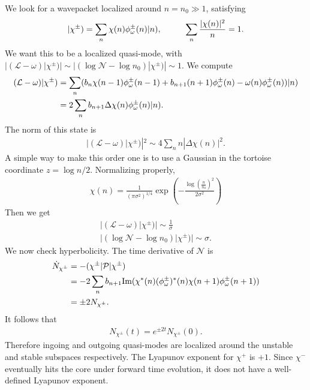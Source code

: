 \documentclass[JHEP,12pt]{article}
\begin{document}
We look for a wavepacket localized around $n=n_0\gg1$, satisfying
\begin{align}
|\chi^{\pm})=\sum_n \chi(n)\phi^{\pm}_\omega(n)|n),\hspace{10 mm}\sum_n \frac{|\chi(n)|^2}{n}=1.
\end{align}
We want this to be a localized quasi-mode, with $|(\mathcal{L}-\omega)|\chi^{\pm})|\sim |(\log\mathcal{N}-\log n_0)|\chi^{\pm})|\sim 1$. We compute 
\begin{align}
(\mathcal{L}-\omega)|\chi^{\pm})&=\sum_n (b_n\chi(n-1)\phi^{\pm}_\omega(n-1)+b_{n+1}(n+1)\phi^{\pm}_\omega(n)-\omega(n)\phi^{\pm}_\omega(n))|n)\notag\\
&=2\sum_n b_{n+1}\Delta\chi(n)\phi^{\pm}_\omega(n)|n).
\end{align}
The norm of this state is
\begin{align}
|(\mathcal{L}-\omega)|\chi^{\pm})|^2\sim 4\sum_nn |\Delta\chi(n)|^2.
\end{align}
A simple way to make this order one is to use a Gaussian in the tortoise coordinate $z=\log n/2$. Normalizing properly,
\begin{align}
\chi(n)=\frac{1}{(\pi\sigma^2)^{1/4}}\exp\left(-\frac{\log\left(\frac{n}{n_0}\right)^2}{2\sigma^2}\right)
\end{align}
Then we get 
\begin{align}
|(\mathcal{L}-\omega)|\chi^{\pm})|\sim\frac{1}{\sigma}\\
|(\log \mathcal{N}-\log n_0)|\chi^{\pm})|\sim\sigma.
\end{align}
\indent We now check hyperbolicity. The time derivative of $\mathcal{N}$ is 
\begin{align}
\dot{N}_{\chi^{\pm}}&=-(\chi^{\pm}|\mathcal{P}|\chi^{\pm})\notag\\
&=-2\sum_{n}b_{n+1}\text{Im}(\chi^*(n)(\phi^{\pm}_\omega)^*(n)\chi(n+1)\phi^{\pm}_\omega(n+1))\notag\\
&=\pm 2 N_{\chi^{\pm}}.
\end{align}
It follows that 
\begin{align}
N_{\chi^{\pm}}(t)=e^{\pm 2t}N_{\chi^{\pm}}(0).
\end{align}
Therefore ingoing and outgoing quasi-modes are localized around the unstable and stable subspaces respectively. The Lyapunov exponent for $\chi^{+}$ is $+1$. Since $\chi^-$ eventually hits the core under forward time evolution, it does not have a well-defined Lyapunov exponent.\\
\end{document}

